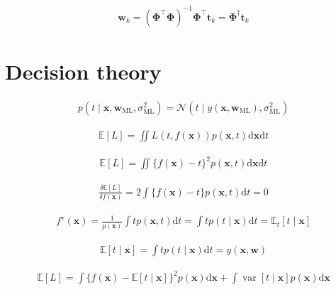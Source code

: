 \documentclass{article}
\begin{document}
\begin{align*}
\mathbf{w}_k = \left( \boldsymbol{\Phi}^{\top} \boldsymbol{\Phi} \right)^{-1} \boldsymbol{\Phi}^{\top} \mathbf{t}_k = \boldsymbol{\Phi}^{\dagger} \mathbf{t}_k
\tag{4.32}
\end{align*}


\section{Decision theory}

\begin{align*}
p\left(t \mid \mathbf{x}, \mathbf{w}_{\mathrm{ML}}, \sigma_{\mathrm{ML}}^{2}\right) = \mathcal{N}\left( t \mid y\left( \mathbf{x}, \mathbf{w}_{\mathrm{ML}} \right), \sigma_{\mathrm{ML}}^{2} \right)
\tag{4.33}
\end{align*}

\begin{align*}
\mathbb{E}[L] = \iint L(t, f(\mathbf{x})) p(\mathbf{x}, t) \mathrm{d} \mathbf{x} \mathrm{d} t
\tag{4.34}
\end{align*}

\begin{align*}
\mathbb{E}[L] = \iint \{f(\mathbf{x}) - t\}^{2} p(\mathbf{x}, t) \mathrm{d} \mathbf{x} \mathrm{d} t
\tag{4.35}
\end{align*}

\begin{align*}
\frac{\delta \mathbb{E}[L]}{\delta f(\mathbf{x})} = 2 \int \{ f(\mathbf{x}) - t \} p(\mathbf{x}, t) \mathrm{d} t = 0
\tag{4.36}
\end{align*}

\begin{align*}
f^{\star}(\mathbf{x}) = \frac{1}{p(\mathbf{x})} \int t p(\mathbf{x}, t) \mathrm{d} t = \int t p(t \mid \mathbf{x}) \mathrm{d} t = \mathbb{E}_{t}[t \mid \mathbf{x}]
\tag{4.37}
\end{align*}

\begin{align*}
\mathbb{E}[t \mid \mathbf{x}] = \int t p(t \mid \mathbf{x}) \mathrm{d} t = y(\mathbf{x}, \mathbf{w})
\tag{4.38}
\end{align*}

\begin{align*}
\mathbb{E}[L] = \int \{ f(\mathbf{x}) - \mathbb{E}[t \mid \mathbf{x}] \}^{2} p(\mathbf{x}) \mathrm{d} \mathbf{x} + \int \operatorname{var}[t \mid \mathbf{x}] p(\mathbf{x}) \mathrm{d} \mathbf{x}
\tag{4.39}
\end{align*}
\end{document}
